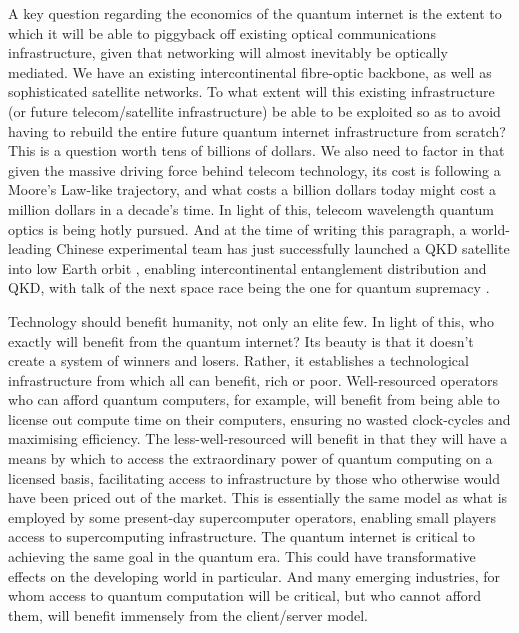 \documentclass[aps, rmp, twocolumn, amsmath, amssymb, nofootinbib, superscriptaddress, longbibliography, floatfix, table-of-contents, eqsecnum]{revtex4-1}
\begin{document}
A key question regarding the economics of the quantum internet is the extent to which it will be able to piggyback off existing optical communications infrastructure, given that networking will almost inevitably be optically mediated. We have an existing intercontinental fibre-optic backbone, as well as sophisticated satellite networks. To what extent will this existing infrastructure (or future telecom/satellite infrastructure) be able to be exploited so as to avoid having to rebuild the entire future quantum internet infrastructure from scratch? This is a question worth tens of billions of dollars. We also need to factor in that given the massive driving force behind telecom technology, its cost is following a Moore's Law-like trajectory, and what costs a billion dollars today might cost a million dollars in a decade's time. In light of this, telecom wavelength quantum optics is being hotly pursued. And at the time of writing this paragraph, a world-leading Chinese experimental team has just successfully launched a QKD satellite into low Earth orbit \cite{???}, enabling intercontinental entanglement distribution and QKD, with talk of the next space race being the one for quantum supremacy \cite{???}.

Technology should benefit humanity, not only an elite few. In light of this, who exactly will benefit from the quantum internet? Its beauty is that it doesn't create a system of winners and losers. Rather, it establishes a technological infrastructure from which all can benefit, rich or poor. Well-resourced operators who can afford quantum computers, for example, will benefit from being able to license out compute time on their computers, ensuring no wasted clock-cycles and maximising efficiency. The less-well-resourced will benefit in that they will have a means by which to access the extraordinary power of quantum computing on a licensed basis, facilitating access to infrastructure by those who otherwise would have been priced out of the market. This is essentially the same model as what is employed by some present-day supercomputer operators, enabling small players access to supercomputing infrastructure. The quantum internet is critical to achieving the same goal in the quantum era. This could have transformative effects on the developing world in particular. And many emerging industries, for whom access to quantum computation will be critical, but who cannot afford them, will benefit immensely from the client/server model.
\end{document}
